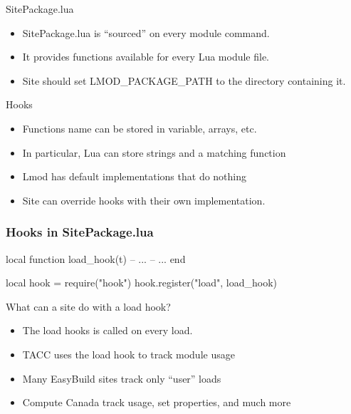 \documentclass{beamer}
\begin{document}
\begin{frame}{SitePackage.lua}
  \begin{itemize}
    \item SitePackage.lua is ``sourced'' on every module command.
    \item It provides functions available for every Lua module file.
    \item Site should set LMOD_PACKAGE_PATH to the directory
      containing it.
  \end{itemize}
\end{frame}

\begin{frame}{Hooks}
  \begin{itemize}
    \item Functions name can be stored in variable, arrays, etc.
    \item In particular, Lua can store strings and a matching function
    \item Lmod has default implementations that do nothing
    \item Site can override hooks with their own implementation.
  \end{itemize}
\end{frame}

\begin{frame}[fragile]
  \frametitle{Hooks in SitePackage.lua}
  \begin{itemize}
    {\tiny
\begin{semiverbatim}
local function load_hook(t)
   -- ...
   -- ...
end

local hook = require("hook")
hook.register("load", load_hook)
\end{semiverbatim}
    }
    \end{itemize}
\end{frame}


\begin{frame}{What can a site do with a load hook?}
  \begin{itemize}
    \item The load hooks is called on every load.
    \item TACC uses the load hook to track module usage
    \item Many EasyBuild sites track only ``user'' loads 
    \item Compute Canada track usage, set properties, and much more
  \end{itemize}
\end{frame}
\end{document}
